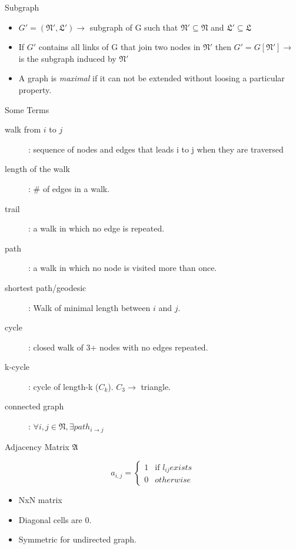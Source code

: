 \documentclass{beamer}
\begin{document}

\begin{frame}{Subgraph}
\begin{itemize}
 \item $G'=(\mathfrak{N',L'}) \rightarrow$ subgraph of G such that $\mathfrak{N'} \subseteq \mathfrak{N}$ and $\mathfrak{L'} \subseteq \mathfrak{L}$
 \item If $G'$ contains all links  of G that join two nodes in $\mathfrak{N'}$ then $G'=G[\mathfrak{N'}] \rightarrow$ is the subgraph induced by $\mathfrak{N'}$
 \item A graph is \textit{maximal} if it can not be extended without loosing a particular property. 
\end{itemize}
\end{frame}


\begin{frame}{Some Terms}
\begin{description}
 \item [walk from $i$ to $j$]: sequence of nodes and edges that leads i to j when they are traversed
 \item [length of the walk]: \# of edges in a walk.
 \item [trail]: a walk in which no edge is repeated.
 \item [path]: a walk in which no node is visited more than once.
 \item [shortest path/geodesic]: Walk of minimal length between $i$ and $j$.
 \item [cycle]: closed walk of 3+ nodes with no edges repeated.
 \item [k-cycle]: cycle of length-k ($C_k$). $C_3 \rightarrow$ triangle.
 \item [connected graph]: $\forall i,j\in\mathfrak{N}, \exists path_{i\rightarrow j}$
\end{description}
\end{frame}


\begin{frame}{Adjacency Matrix $\mathfrak{A}$}

\[
 a_{i,j} =
 \begin{cases}
   1 & \text{if } l_{ij} exists \\
   0       & otherwise
  \end{cases}
\]

\begin{itemize}
 \item NxN matrix
 \item Diagonal cells are 0.
 \item Symmetric for undirected graph.
\end{itemize}


\end{frame}
\end{document}

